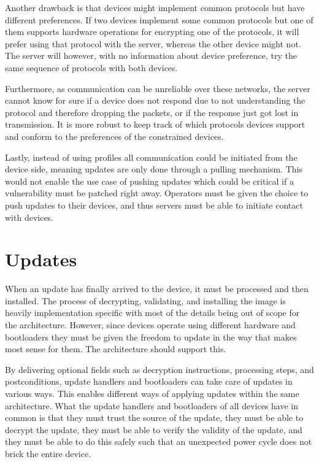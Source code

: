 \documentclass[0-thesis.tex]{subfiles}
\begin{document}
Another drawback is that devices might implement common protocols but have different
preferences. If two devices implement some common protocols but one of them supports
hardware operations for encrypting one of the protocols, it will prefer using that
protocol with the server, whereas the other device might not. The server will however,
with no information about device preference, try the same sequence of protocols with both
devices.

Furthermore, as communication can be unreliable over these networks, the server
cannot know for sure if a device does not respond due to not understanding the protocol
and therefore dropping the packets, or if the response just got lost in transmission. It
is more robust to keep track of which protocols devices support and conform to the
preferences of the constrained devices.

Lastly, instead of using profiles all communication could be initiated from the device
side, meaning updates are only done through a pulling mechanism. This would not enable the
use case of pushing updates which could be critical if a vulnerability must be patched
right away. Operators must be given the choice to push updates to their devices, and thus
servers must be able to initiate contact with devices.


\section{Updates}
\label{sec:updates}

When an update has finally arrived to the device, it must be processed and then installed.
The process of decrypting, validating, and installing the image is heavily implementation
specific with most of the details being out of scope for the architecture. However, since
devices operate using different hardware and bootloaders they must be given the freedom
to update in the way that makes most sense for them. The architecture should support this.

By delivering optional fields such as decryption instructions, processing steps, and
postconditions, update handlers and bootloaders can take care of updates in various ways.
This enables different ways of applying updates within the same architecture. What the
update handlers and bootloaders of all devices have in common is that they must trust the
source of the update, they must be able to decrypt the update, they must be able to verify
the validity of the update, and they must be able to do this safely such that an
unexpected power cycle does not brick the entire device.
\end{document}
